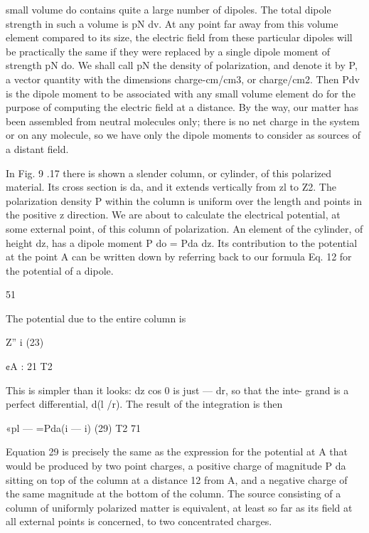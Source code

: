 {%
small volume do contains quite a large number of dipoles. The total
dipole strength in such a volume is pN dv. At any point far away
from this volume element compared to its size, the electric field from
these particular dipoles will be practically the same if they were replaced
by a single dipole moment of strength pN do. We shall call pN
the density of polarization, and denote it by P, a vector quantity with
the dimensions charge-cm/cm3, or charge/cm2. Then Pdv is the
dipole moment to be associated with any small volume element do
for the purpose of computing the electric field at a distance. By the
way, our matter has been assembled from neutral molecules only;
there is no net charge in the system or on any molecule, so we have
only the dipole moments to consider as sources of a distant field.

In Fig. 9 .17 there is shown a slender column, or cylinder, of this
polarized material. Its cross section is da, and it extends vertically
from zl to Z2. The polarization density P within the column is uniform
over the length and points in the positive z direction. We are
about to calculate the electrical potential, at some external point, of
this column of polarization. An element of the cylinder, of height dz,
has a dipole moment P do = Pda dz. Its contribution to the potential
at the point A can be written down by referring back to our
formula Eq. 12 for the potential of a dipole.

\begin{equation}
\end{equation}
51%

The potential due to the entire column is

\begin{equation}
\end{equation}
Z'' i (23)

¢A :  21 T2

This is simpler than it looks: dz cos 0 is just  --- dr, so that the inte-
grand is a perfect differential, d(l /r). The result of the integration is
then

\begin{equation}
\end{equation}
«pl --- =Pda(i --- i) (29)
T2 71

Equation 29 is precisely the same as the expression for the potential
at A that would be produced by two point charges, a positive
charge of magnitude P da sitting on top of the column at a distance 12
from A, and a negative charge of the same magnitude at the bottom
of the column. The source consisting of a column of uniformly
polarized matter is equivalent, at least so far as its field at all external
points is concerned, to two concentrated charges.

}
